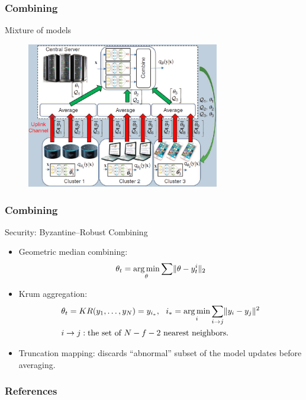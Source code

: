 \begin{frame}
\frametitle{Combining}

\begin{block}{Mixture of models}
\begin{figure}
\centering
\includegraphics[width=0.75\textwidth]{images/mixture-models.png}
\end{figure}
\end{block}

\end{frame}


\begin{frame}
\frametitle{Combining}

\begin{block}{Security: Byzantine–Robust Combining}
\begin{itemize}
    \item Geometric median combining:
    \vspace{-0.5em}
    {\smaller
    $$\theta_t = \operatorname*{arg\,min}_{\theta} \sum \lVert \theta - y_t^i \rVert_2$$}
    \vspace{-1em}
    \item Krum aggregation\cite{NIPS2017_krum}:
    \vspace{-0.5em}
    {\smaller
    \begin{align*}
    & \theta_t = KR(y_1,\ldots,y_N) = y_{i_*}, ~~ i_* = \operatorname*{arg\,min}_{i} \sum\limits_{i\to j} \lVert y_i - y_j \rVert^2 \\
    & i\to j: \text{the set of $N-f-2$ nearest neighbors.}
    \end{align*}}
    \vspace{-2em}
    \item Truncation mapping: discards ``abnormal'' subset of the model updates before averaging.
\end{itemize}
\end{block}


\end{frame}


\begin{frame}[allowframebreaks]
\frametitle{References}

{\footnotesize


}

\end{frame}



